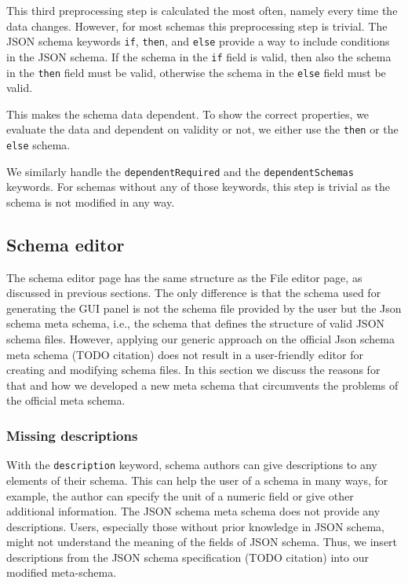 This third preprocessing step is calculated the most often, namely every time the data changes.
However, for most schemas this preprocessing step is trivial.
The JSON schema keywords \texttt{if}, \texttt{then}, and \texttt{else} provide a way to include conditions in the JSON schema.
If the schema in the \texttt{if} field is valid, then also the schema in the \texttt{then} field must be valid, otherwise the
schema in the \texttt{else} field must be valid.

This makes the schema data dependent.
To show the correct properties, we evaluate the data and dependent on validity or not, we either use the \texttt{then} or the \texttt{else} schema.

We similarly handle the \texttt{dependentRequired} and the \texttt{dependentSchemas} keywords.
For schemas without any of those keywords, this step is trivial as the schema is not modified in any way.


\subsection{Schema editor}\label{subsec:schema-editor}

The schema editor page has the same structure as the File editor page, as discussed in previous sections.
The only difference is that the schema used for generating the GUI panel is not the schema file provided by the user but the Json schema meta schema,
i.e., the schema that defines the structure of valid JSON schema files.
However, applying our generic approach on the official Json schema meta schema (TODO citation) does not result in a user-friendly editor for
creating and modifying schema files.
In this section we discuss the reasons for that and how we developed a new meta schema that circumvents the problems of the official meta schema.

\subsubsection{Missing descriptions}
With the \texttt{description} keyword, schema authors can give descriptions to any elements of their schema.
This can help the user of a schema in many ways, for example, the author can specify the unit of a numeric field or give other additional information.
The JSON schema meta schema does not provide any descriptions.
Users, especially those without prior knowledge in JSON schema, might not understand the meaning of the fields of JSON schema.
Thus, we insert descriptions from the JSON schema specification (TODO citation) into our modified meta-schema.

